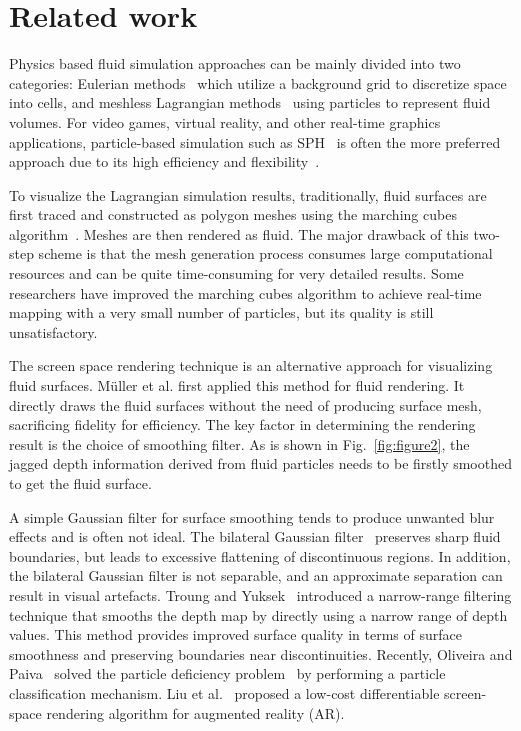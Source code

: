 \documentclass[times,twocolumn,final]{elsarticle}
\begin{document}
\section{Related work}
Physics based fluid simulation approaches can be mainly divided into two categories: Eulerian methods~\cite{ref:ref4} which utilize a background grid to discretize space into cells, and meshless Lagrangian methods~\cite{ref:ref7} using particles to represent fluid volumes. For video games, virtual reality, and other real-time graphics applications, particle-based simulation such as SPH~\cite{IISPH2013,DFSPH2015,ref:ref5} is often the more preferred approach due to its high efficiency and flexibility~\cite{carensac2022optimizations}. 

To visualize the Lagrangian simulation results, traditionally, fluid surfaces are first traced and constructed as polygon meshes using the marching cubes algorithm~\cite{ref:ref12,ref:ref6,yang2020completely}. Meshes are then rendered as fluid. The major drawback of this two-step scheme is that the mesh generation process consumes large computational resources and can be quite time-consuming for very detailed results. Some researchers have improved the marching cubes algorithm to achieve real-time mapping with a very small number of particles, but its quality is still unsatisfactory\cite{ref:ref10}.

The screen space rendering technique is an alternative approach for visualizing fluid surfaces. M{\"u}ller et al.\cite{ref:ref2} first applied this method for fluid rendering. It directly draws the fluid surfaces without the need of producing surface mesh, sacrificing fidelity for efficiency. The key factor in determining the rendering result is the choice of smoothing filter. As is shown in Fig.~\ref{fig:figure2}, the jagged depth information derived from fluid particles needs to be firstly smoothed to get the fluid surface. 

A simple Gaussian filter for surface smoothing\cite{ref:ref2} tends to produce unwanted blur effects and is often not ideal. The bilateral Gaussian filter~\cite{ref:ref15,neto2017real} preserves sharp fluid boundaries, but leads to excessive flattening of discontinuous regions. In addition, the bilateral Gaussian filter is not separable, and an approximate separation can result in visual artefacts. Troung and Yuksek~\cite{truong2018narrow} introduced a narrow-range filtering technique that smooths the depth map by directly using a narrow range of depth values. This method provides improved surface quality in terms of surface smoothness and preserving boundaries near discontinuities.
Recently, Oliveira and Paiva~\cite{oliveira2022narrow} solved the particle deficiency problem~\cite{truong2018narrow} by performing a particle classification mechanism. Liu et al.~\cite{liu2022real} proposed a low-cost differentiable screen-space rendering algorithm for augmented reality (AR).
\end{document}
